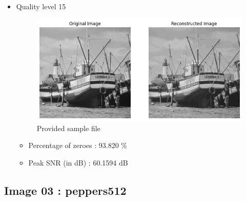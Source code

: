 \documentclass[11pt,a4paper]{article}
\begin{document}
\begin{itemize}
    \newpage



    \item Quality level 15
    {\begin{figure}[h]
        \centering
        \includegraphics[width=1.0\linewidth]{images/im2q3.png}
        \caption{Provided sample file}
    \end{figure}}

    \begin{itemize}
        \item Percentage of zeroes : 93.820 \%
        \item Peak SNR (in dB)     : 60.1594 dB
    \end{itemize}

    
\end{itemize}


\subsection{Image 03 : peppers512} 
\end{document}
